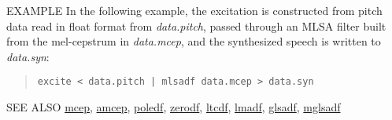 \begin{qsection}{EXAMPLE}
In the following example,
the excitation is constructed from pitch data
read in float format from {\em data.pitch},
passed through an MLSA filter 
built from the mel-cepstrum in
{\em data.mcep},
and the synthesized speech is written to {\em data.syn}:
\begin{quote}
 \verb!excite < data.pitch | mlsadf data.mcep > data.syn!
\end{quote} 
\end{qsection}

\begin{qsection}{SEE ALSO}
\hyperlink{mcep}{mcep},
\hyperlink{amcep}{amcep},
\hyperlink{poledf}{poledf},
\hyperlink{zerodf}{zerodf},
\hyperlink{ltcdf}{ltcdf},
\hyperlink{lmadf}{lmadf},
\hyperlink{glsadf}{glsadf},
\hyperlink{mglsadf}{mglsadf}
\end{qsection}
